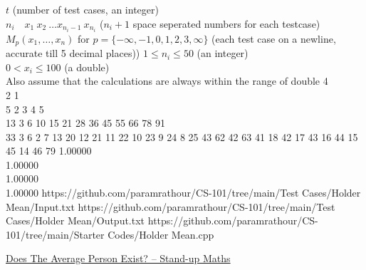 \documentclass[../../Problems]{subfiles}
\begin{document}
\begin{testcasesMore}
	{$t$ \hfill(number of test cases, an integer)\\
	$n_i\quad x_1\ x_2\ \ldots x_{n_i-1}\ x_{n_i}$ \hfill($n_i+1$ space seperated numbers for each testcase)}
	{$M_{p}(x_{1},\dots ,x_{n})$ for $p=\{-\infty, -1, 0, 1, 2, 3, \infty\}$ \hfill{(each test case on a newline, accurate till 5 decimal places))}}
	{$1 \leq n_i \leq 50$ \hfill{(an integer)}\\
	$0 < x_i \leq 100$ \hfill{(a double)}\\
	Also assume that the calculations are always within the range of double}
	{4\\2 1\\5 2 3 4 5\\13 3 6 10 15 21 28 36 45 55 66 78 91\\33 3 6 2 7 13 20 12 21 11 22 10 23 9 24 8 25 43 62 42 63 41 18 42 17 43 16 44 15 45 14 46 79}
	{1.00000\\1.00000\\1.00000\\1.00000}
	{https://github.com/paramrathour/CS-101/tree/main/Test Cases/Holder Mean/Input.txt}
	{https://github.com/paramrathour/CS-101/tree/main/Test Cases/Holder Mean/Output.txt}
	{https://github.com/paramrathour/CS-101/tree/main/Starter Codes/Holder Mean.cpp}
\end{testcasesMore}
\begin{funvideo}
\href{https://youtu.be/NbiveCNBOxk}{Does The Average Person Exist? -- Stand-up Maths}
\end{funvideo}
\end{document}
